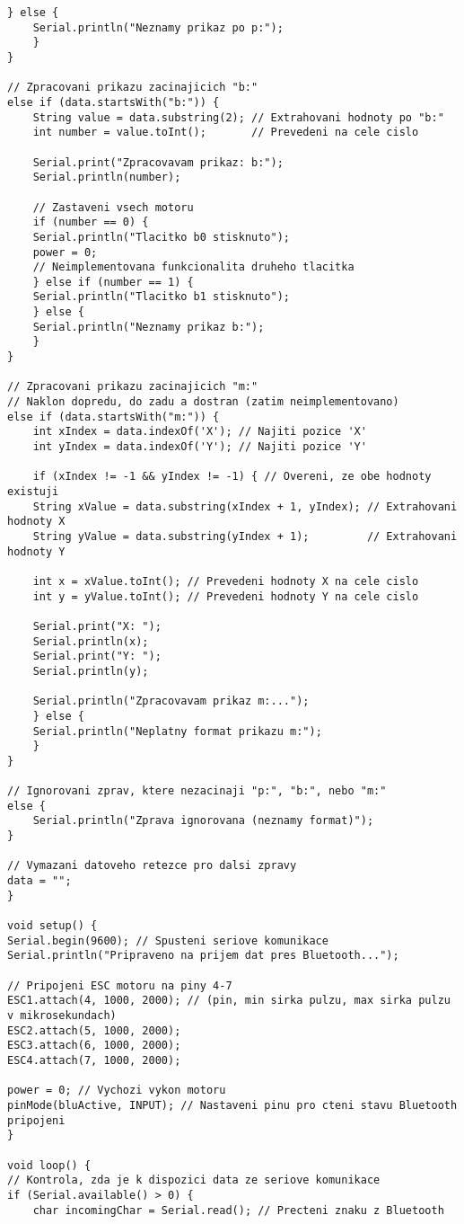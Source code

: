 \documentclass[12pt]{report}
\begin{document}
\begin{appendices}
\begin{lstlisting}[title={}, caption={}, label={}, basicstyle=\footnotesize\ttfamily, inputencoding=utf8]
	} else {
	Serial.println("Neznamy prikaz po p:");
	}
}

// Zpracovani prikazu zacinajicich "b:"
else if (data.startsWith("b:")) {
	String value = data.substring(2); // Extrahovani hodnoty po "b:"
	int number = value.toInt();       // Prevedeni na cele cislo

	Serial.print("Zpracovavam prikaz: b:");
	Serial.println(number);

	// Zastaveni vsech motoru
	if (number == 0) {
	Serial.println("Tlacitko b0 stisknuto");
	power = 0;
	// Neimplementovana funkcionalita druheho tlacitka
	} else if (number == 1) {
	Serial.println("Tlacitko b1 stisknuto");
	} else {
	Serial.println("Neznamy prikaz b:");
	}
}

// Zpracovani prikazu zacinajicich "m:"
// Naklon dopredu, do zadu a dostran (zatim neimplementovano)
else if (data.startsWith("m:")) {
	int xIndex = data.indexOf('X'); // Najiti pozice 'X'
	int yIndex = data.indexOf('Y'); // Najiti pozice 'Y'

	if (xIndex != -1 && yIndex != -1) { // Overeni, ze obe hodnoty existuji
	String xValue = data.substring(xIndex + 1, yIndex); // Extrahovani hodnoty X
	String yValue = data.substring(yIndex + 1);         // Extrahovani hodnoty Y

	int x = xValue.toInt(); // Prevedeni hodnoty X na cele cislo
	int y = yValue.toInt(); // Prevedeni hodnoty Y na cele cislo

	Serial.print("X: ");
	Serial.println(x);
	Serial.print("Y: ");
	Serial.println(y);

	Serial.println("Zpracovavam prikaz m:...");
	} else {
	Serial.println("Neplatny format prikazu m:");
	}
}

// Ignorovani zprav, ktere nezacinaji "p:", "b:", nebo "m:"
else {
	Serial.println("Zprava ignorovana (neznamy format)");
}

// Vymazani datoveho retezce pro dalsi zpravy
data = "";
}

void setup() {
Serial.begin(9600); // Spusteni seriove komunikace
Serial.println("Pripraveno na prijem dat pres Bluetooth...");

// Pripojeni ESC motoru na piny 4-7
ESC1.attach(4, 1000, 2000); // (pin, min sirka pulzu, max sirka pulzu v mikrosekundach)
ESC2.attach(5, 1000, 2000);
ESC3.attach(6, 1000, 2000);
ESC4.attach(7, 1000, 2000);

power = 0; // Vychozi vykon motoru
pinMode(bluActive, INPUT); // Nastaveni pinu pro cteni stavu Bluetooth pripojeni
}

void loop() {
// Kontrola, zda je k dispozici data ze seriove komunikace
if (Serial.available() > 0) {
	char incomingChar = Serial.read(); // Precteni znaku z Bluetooth


\end{lstlisting}
\end{appendices}
\end{document}
